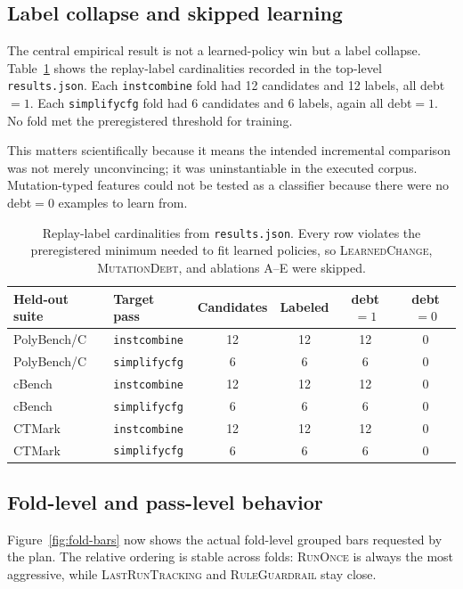 \documentclass{article}
\begin{document}
\subsection{Label collapse and skipped learning}

The central empirical result is not a learned-policy win but a label collapse. Table~\ref{tab:labels} shows the replay-label cardinalities recorded in the top-level \texttt{results.json}. Each \texttt{instcombine} fold had 12 candidates and 12 labels, all debt$=1$. Each \texttt{simplifycfg} fold had 6 candidates and 6 labels, again all debt$=1$. No fold met the preregistered threshold for training.

This matters scientifically because it means the intended incremental comparison was not merely unconvincing; it was uninstantiable in the executed corpus. Mutation-typed features could not be tested as a classifier because there were no debt$=0$ examples to learn from.

\begin{table}[t]
\caption{Replay-label cardinalities from \texttt{results.json}. Every row violates the preregistered minimum needed to fit learned policies, so \textsc{LearnedChange}, \textsc{MutationDebt}, and ablations A--E were skipped.}
\label{tab:labels}
\centering
\small
\begin{tabular}{llcccc}
\toprule
Held-out suite & Target pass & Candidates & Labeled & debt$=1$ & debt$=0$ \\
\midrule
PolyBench/C & \texttt{instcombine} & 12 & 12 & 12 & 0 \\
PolyBench/C & \texttt{simplifycfg} & 6 & 6 & 6 & 0 \\
cBench & \texttt{instcombine} & 12 & 12 & 12 & 0 \\
cBench & \texttt{simplifycfg} & 6 & 6 & 6 & 0 \\
CTMark & \texttt{instcombine} & 12 & 12 & 12 & 0 \\
CTMark & \texttt{simplifycfg} & 6 & 6 & 6 & 0 \\
\bottomrule
\end{tabular}
\end{table}

\subsection{Fold-level and pass-level behavior}

Figure~\ref{fig:fold-bars} now shows the actual fold-level grouped bars requested by the plan. The relative ordering is stable across folds: \textsc{RunOnce} is always the most aggressive, while \textsc{LastRunTracking} and \textsc{RuleGuardrail} stay close.
\end{document}
